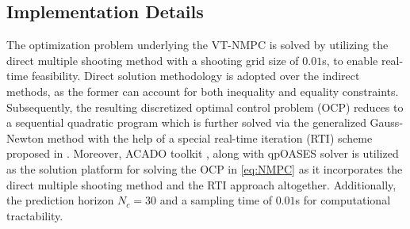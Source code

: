 \subsection{Implementation Details}
The optimization problem underlying the \ac{VT-NMPC} is solved by utilizing the direct multiple shooting method with a shooting grid size of $0.01$s, to enable real-time feasibility. Direct solution methodology is adopted over the indirect methods, as the former can account for both inequality and equality constraints. Subsequently, the resulting discretized optimal control problem (OCP) reduces to a sequential quadratic program which is further solved via the generalized Gauss-Newton method with the help of a special real-time iteration (RTI) scheme proposed in \cite{DIEHL2002577}. Moreover, ACADO toolkit \cite{acado}, along with qpOASES solver %
is utilized as the solution platform for solving the OCP in \eqref{eq:NMPC}
as it incorporates the direct multiple shooting method and the RTI approach altogether. Additionally, the prediction horizon $N_c = 30$ and a sampling time of $0.01$s for computational tractability.


